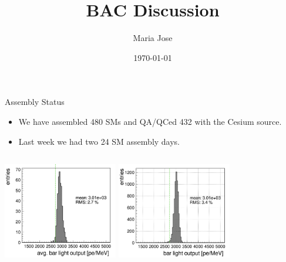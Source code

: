 \documentclass{beamer}
\title [BAC Discussion]{ BAC Discussion}
\author[Maria Jose]{Maria Jose}
\date{\today}
\institute[UVA]{University of Virginia}
\begin{document}
\maketitle
\begin{frame}{Assembly Status}
\begin{itemize}
    \item We have assembled 480 SMs and QA/QCed 432 with the Cesium source.
    \item Last week we had two 24 SM assembly days.
\end{itemize}
\centering
\includegraphics[width=5cm, height=5cm]{../btl_files/summary_plots/summary_432.png}
\includegraphics[width =5cm, height =5cm]{../btl_files/summary_plots/summary_432_ch.png}
\end{frame}
\end{document}
